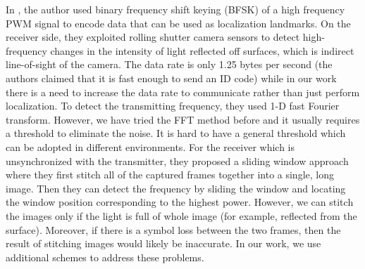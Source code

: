 In \cite{landmark}, the author used binary frequency shift keying (BFSK) of a high frequency PWM signal to encode data that can be used as localization landmarks. On the receiver side, they exploited rolling shutter camera sensors to detect high-frequency changes in the intensity of light reflected off surfaces, which is indirect line-of-sight of the camera. The data rate is only 1.25 bytes per second (the authors claimed that it is fast enough to send an ID code) while in our work there is a need to increase the data rate to communicate rather than just perform localization. To detect the transmitting frequency, they used 1-D fast Fourier transform. However, we have tried the FFT method before and it usually requires a threshold to eliminate the noise. It is hard to have a general threshold which can be adopted in different environments. For the receiver which is unsynchronized with the transmitter, they proposed a sliding window approach where they first stitch all of the captured frames together into a single, long image. Then they can detect the frequency by sliding the window and locating the window position corresponding to the highest power. However, we can stitch the images only if the light is full of whole image (for example, reflected from the surface). Moreover, if there is a symbol loss between the two frames, then the result of stitching images would likely be inaccurate. In our work, we use additional schemes to address these problems.